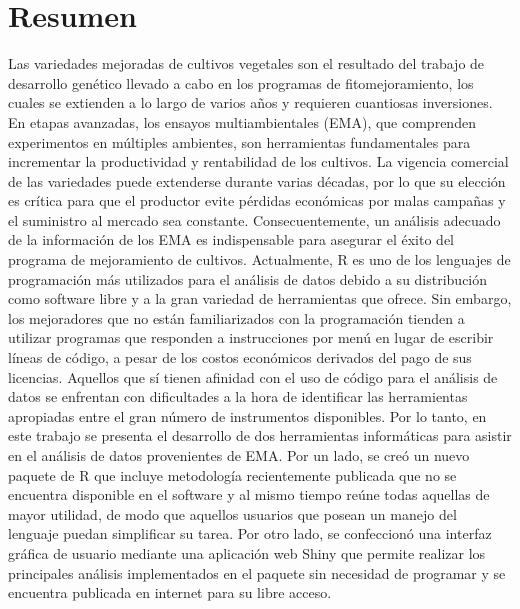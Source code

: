  
\chapter*{Resumen}

Las variedades mejoradas de cultivos vegetales son el resultado del trabajo de desarrollo genético llevado a cabo en los programas de fitomejoramiento, los cuales se extienden a lo largo de varios años y requieren cuantiosas inversiones. En etapas avanzadas, los ensayos multiambientales (EMA), que comprenden experimentos en múltiples ambientes, son herramientas fundamentales para incrementar la productividad y rentabilidad de los cultivos. La vigencia comercial de las variedades puede extenderse durante varias décadas, por lo que su elección es crítica para que el productor evite pérdidas económicas por malas campañas y el suministro al mercado sea constante. Consecuentemente, un análisis adecuado de la información de los EMA es indispensable para asegurar el éxito del programa de mejoramiento de cultivos. Actualmente, R es uno de los lenguajes de programación más utilizados para el análisis de datos debido a su distribución como software libre y a la gran variedad de herramientas que ofrece. Sin embargo, los mejoradores que no están familiarizados con la programación tienden a utilizar programas que responden a instrucciones por menú en lugar de escribir líneas de código, a pesar de los costos económicos derivados del pago de sus licencias. Aquellos que sí tienen afinidad con el uso de código para el análisis de datos se enfrentan con dificultades a la hora de identificar las herramientas apropiadas entre el gran número de instrumentos disponibles. Por lo tanto, en este trabajo se presenta el desarrollo de dos herramientas informáticas para asistir en el análisis de datos provenientes de EMA. Por un lado, se creó un nuevo paquete de R que incluye metodología recientemente publicada que no se encuentra disponible en el software y al mismo tiempo reúne todas aquellas de mayor utilidad, de modo que aquellos usuarios que posean un manejo del lenguaje puedan simplificar su tarea. Por otro lado, se confeccionó una interfaz gráfica de usuario mediante una aplicación web Shiny que permite realizar los principales análisis implementados en el paquete sin necesidad de programar y se encuentra publicada en internet para su libre acceso.

